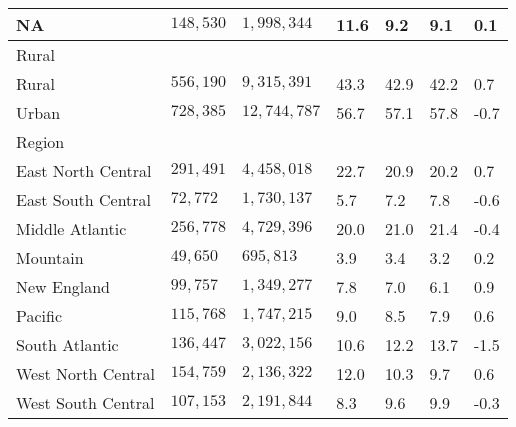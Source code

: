 \begin{longtable}{lllllll}
NA & $148,530$ & $1,998,344$ & 11.6 & 9.2 & 9.1 & 0.1 \\ 
\midrule
\multicolumn{1}{l}{Rural} \\ 
\midrule
Rural & $556,190$ & $9,315,391$ & 43.3 & 42.9 & 42.2 & 0.7 \\ 
Urban & $728,385$ & $12,744,787$ & 56.7 & 57.1 & 57.8 & -0.7 \\ 
\midrule
\multicolumn{1}{l}{Region} \\ 
\midrule
East North Central  & $291,491$ & $4,458,018$ & 22.7 & 20.9 & 20.2 & 0.7 \\ 
East South Central  & $72,772$ & $1,730,137$ & 5.7 & 7.2 & 7.8 & -0.6 \\ 
Middle Atlantic  & $256,778$ & $4,729,396$ & 20.0 & 21.0 & 21.4 & -0.4 \\ 
Mountain  & $49,650$ & $695,813$ & 3.9 & 3.4 & 3.2 & 0.2 \\ 
New England  & $99,757$ & $1,349,277$ & 7.8 & 7.0 & 6.1 & 0.9 \\ 
Pacific  & $115,768$ & $1,747,215$ & 9.0 & 8.5 & 7.9 & 0.6 \\ 
South Atlantic  & $136,447$ & $3,022,156$ & 10.6 & 12.2 & 13.7 & -1.5 \\ 
West North Central  & $154,759$ & $2,136,322$ & 12.0 & 10.3 & 9.7 & 0.6 \\ 
West South Central  & $107,153$ & $2,191,844$ & 8.3 & 9.6 & 9.9 & -0.3 \\ 
 \bottomrule
\end{longtable}

